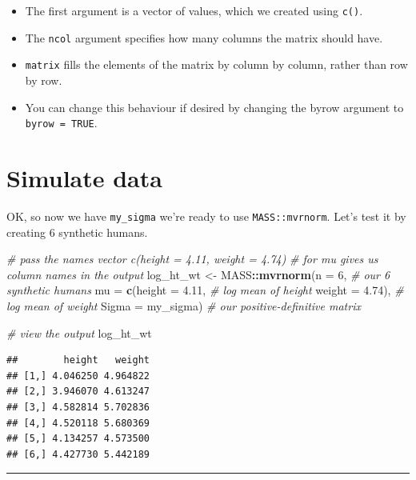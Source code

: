 \documentclass[
]{article}
\newenvironment{Shaded}{\begin{snugshade}}{\end{snugshade}}
\newcommand{\AttributeTok}[1]{\textcolor[rgb]{0.13,0.29,0.53}{#1}}
\newcommand{\CommentTok}[1]{\textcolor[rgb]{0.56,0.35,0.01}{\textit{#1}}}
\newcommand{\DecValTok}[1]{\textcolor[rgb]{0.00,0.00,0.81}{#1}}
\newcommand{\FloatTok}[1]{\textcolor[rgb]{0.00,0.00,0.81}{#1}}
\newcommand{\FunctionTok}[1]{\textcolor[rgb]{0.13,0.29,0.53}{\textbf{#1}}}
\newcommand{\NormalTok}[1]{#1}
\newcommand{\OtherTok}[1]{\textcolor[rgb]{0.56,0.35,0.01}{#1}}
\newcommand{\SpecialCharTok}[1]{\textcolor[rgb]{0.81,0.36,0.00}{\textbf{#1}}}
\providecommand{\tightlist}{%
  \setlength{\itemsep}{0pt}\setlength{\parskip}{0pt}}
\begin{document}
\begin{itemize}
\tightlist
\item
  The first argument is a vector of values, which we created using
  \texttt{c()}.
\item
  The \texttt{ncol} argument specifies how many columns the matrix
  should have.
\item
  \texttt{matrix} fills the elements of the matrix by column by column,
  rather than row by row.
\item
  You can change this behaviour if desired by changing the byrow
  argument to \texttt{byrow\ =\ TRUE}.
\end{itemize}

\hypertarget{simulate-data}{%
\section{Simulate data}\label{simulate-data}}

OK, so now we have \texttt{my\_sigma} we're ready to use
\texttt{MASS::mvrnorm}. Let's test it by creating 6 synthetic humans.

\begin{Shaded}
\begin{Highlighting}[]
\CommentTok{\# pass the names vector c(height = 4.11, weight = 4.74)}
\CommentTok{\# for mu gives us column names in the output}
\NormalTok{log\_ht\_wt }\OtherTok{\textless{}{-}}
\NormalTok{  MASS}\SpecialCharTok{::}\FunctionTok{mvrnorm}\NormalTok{(}\AttributeTok{n =} \DecValTok{6}\NormalTok{,                 }\CommentTok{\# our 6 synthetic humans }
                \AttributeTok{mu =} \FunctionTok{c}\NormalTok{(}\AttributeTok{height =} \FloatTok{4.11}\NormalTok{,  }\CommentTok{\# log mean of height }
                       \AttributeTok{weight =} \FloatTok{4.74}\NormalTok{), }\CommentTok{\# log mean of weight}
                \AttributeTok{Sigma =}\NormalTok{ my\_sigma)      }\CommentTok{\# our positive{-}definitive matrix}

\CommentTok{\# view the output}
\NormalTok{log\_ht\_wt}
\end{Highlighting}
\end{Shaded}

\begin{verbatim}
##        height   weight
## [1,] 4.046250 4.964822
## [2,] 3.946070 4.613247
## [3,] 4.582814 5.702836
## [4,] 4.520118 5.680369
## [5,] 4.134257 4.573500
## [6,] 4.427730 5.442189
\end{verbatim}

\begin{center}\rule{0.5\linewidth}{0.5pt}\end{center}
\end{document}

